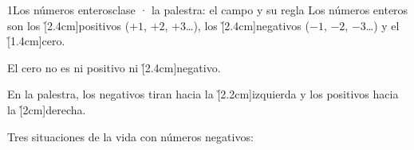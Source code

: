 \documentclass[12pt]{article}
\begin{document}
\portada


\begin{cromo}{1}{Los números enteros}{clase · la palestra: el campo y su regla}
\completa Los números enteros son los \h[2.4cm]{positivos} ($+1$, $+2$, $+3$…), los
\h[2.4cm]{negativos} ($-1$, $-2$, $-3$…) y el \h[1.4cm]{cero}.\par\vspace{2mm}
El cero no es ni positivo ni \h[2.4cm]{negativo}.\par\vspace{2mm}
En la palestra, los negativos tiran hacia la \h[2.2cm]{izquierda} y los positivos hacia la \h[2cm]{derecha}.

\vspace{2mm}
\centerline{}

\vspace{1mm}
\tuejemplo Tres situaciones de la vida con números negativos:
\end{cromo}
\end{document}
